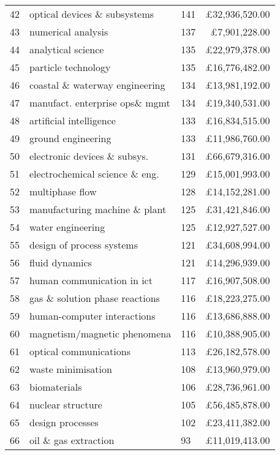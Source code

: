 \begin{spacing}{0.9}
\begin{longtable}[c]{r|>{\raggedleft\arraybackslash}m{6.5cm}|>{\raggedleft\arraybackslash}m{1.9cm}|r}
{42} & {optical devices \& subsystems} & {141} & {\pounds32,936,520.00}\\
{43} & {numerical analysis} & {137} & {\pounds7,901,228.00}\\
{44} & {analytical science} & {135} & {\pounds22,979,378.00}\\
{45} & {particle technology} & {135} & {\pounds16,776,482.00}\\
{46} & {coastal \& waterway engineering} & {134} & {\pounds13,981,192.00}\\
{47} & {manufact. enterprise ops\& mgmt} & {134} & {\pounds19,340,531.00}\\
{48} & {artificial intelligence} & {133} & {\pounds16,834,515.00}\\
{49} & {ground engineering} & {133} & {\pounds11,986,760.00}\\
{50} & {electronic devices \& subsys.} & {131} & {\pounds66,679,316.00}\\
{51} & {electrochemical science \& eng.} & {129} & {\pounds15,001,993.00}\\
{52} & {multiphase flow} & {128} & {\pounds14,152,281.00}\\
{53} & {manufacturing machine \& plant} & {125} & {\pounds31,421,846.00}\\
{54} & {water engineering} & {125} & {\pounds12,927,527.00}\\
{55} & {design of process systems} & {121} & {\pounds34,608,994.00}\\
{56} & {fluid dynamics} & {121} & {\pounds14,296,939.00}\\
{57} & {human communication in ict} & {117} & {\pounds16,907,508.00}\\
{58} & {gas \& solution phase reactions} & {116} & {\pounds18,223,275.00}\\
{59} & {human-computer interactions} & {116} & {\pounds13,686,888.00}\\
{60} & {magnetism/magnetic phenomena} & {116} & {\pounds10,388,905.00}\\
{61} & {optical communications} & {113} & {\pounds26,182,578.00}\\
{62} & {waste minimisation} & {108} & {\pounds13,960,979.00}\\
{63} & {biomaterials} & {106} & {\pounds28,736,961.00}\\
{64} & {nuclear structure} & {105} & {\pounds56,485,878.00}\\
{65} & {design processes} & {102} & {\pounds23,411,382.00}\\
{66} & {oil \& gas extraction} & {93} & {\pounds11,019,413.00}\\

\end{longtable}
\end{spacing}
